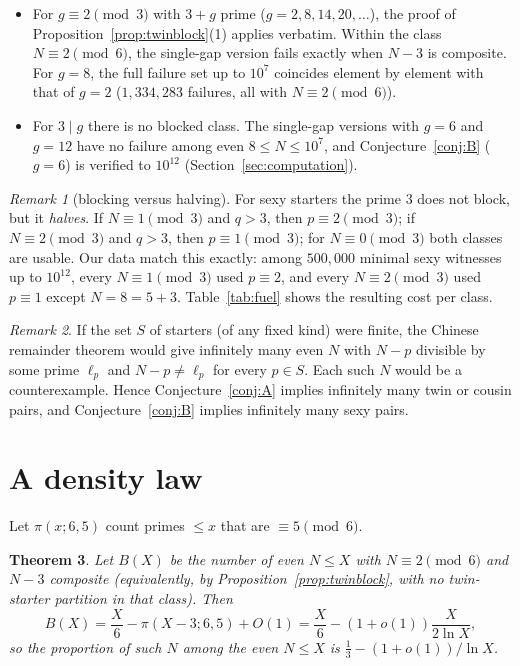 \documentclass[11pt]{article}
\newtheorem{theorem}{Theorem}
\theoremstyle{definition}
\theoremstyle{remark}
\newtheorem{remark}[theorem]{Remark}
\begin{document}
\begin{itemize}
\item For $g\equiv 2\pmod 3$ with $3+g$ prime ($g=2,8,14,20,\dots$), the proof of
Proposition~\ref{prop:twinblock}(1) applies verbatim. Within the class
$N\equiv 2\pmod 6$, the single-gap version fails exactly when $N-3$ is composite.
For $g=8$, the full failure set up to $10^7$ coincides element by element with
that of $g=2$ ($1{,}334{,}283$ failures, all with $N\equiv 2 \pmod 6$).
\item For $3\mid g$ there is no blocked class. The single-gap versions with
$g=6$ and $g=12$ have no failure among even $8\le N\le 10^7$, and
Conjecture~\ref{conj:B} ($g=6$) is verified to $10^{12}$
(Section~\ref{sec:computation}).
\end{itemize}

\begin{remark}[blocking versus halving]\label{rem:halving}
For sexy starters the prime $3$ does not block, but it \emph{halves}. If
$N\equiv 1\pmod 3$ and $q>3$, then $p\equiv 2\pmod 3$; if $N\equiv 2\pmod 3$ and
$q>3$, then $p\equiv 1\pmod 3$; for $N\equiv0\pmod3$ both classes are usable.
Our data match this exactly: among $500{,}000$ minimal sexy witnesses up to
$10^{12}$, every $N\equiv1\pmod3$ used $p\equiv2$, and every $N\equiv2\pmod3$
used $p\equiv1$ except $N=8=5+3$. Table~\ref{tab:fuel} shows the resulting
cost per class.
\end{remark}

\begin{remark}\label{rem:infinitude}
If the set $S$ of starters (of any fixed kind) were finite, the Chinese
remainder theorem would give infinitely many even $N$ with $N-p$ divisible by
some prime $\ell_p$ and $N-p\neq \ell_p$ for every $p\in S$. Each such $N$ would be a
counterexample. Hence Conjecture~\ref{conj:A} implies infinitely many twin or
cousin pairs, and Conjecture~\ref{conj:B} implies infinitely many sexy pairs.
\end{remark}

\section{A density law}\label{sec:law}

Let $\pi(x;6,5)$ count primes $\le x$ that are $\equiv 5\pmod 6$.

\begin{theorem}\label{thm:law}
Let $B(X)$ be the number of even $N\le X$ with $N\equiv 2\pmod 6$ and $N-3$
composite (equivalently, by Proposition~\ref{prop:twinblock}, with no
twin-starter partition in that class). Then
\[
B(X)=\frac{X}{6}-\pi(X-3;6,5)+O(1)
=\frac{X}{6}-(1+o(1))\frac{X}{2\ln X},
\]
so the proportion of such $N$ among the even $N\le X$ is
$\tfrac13-(1+o(1))/\ln X$.
\end{theorem}
\end{document}
